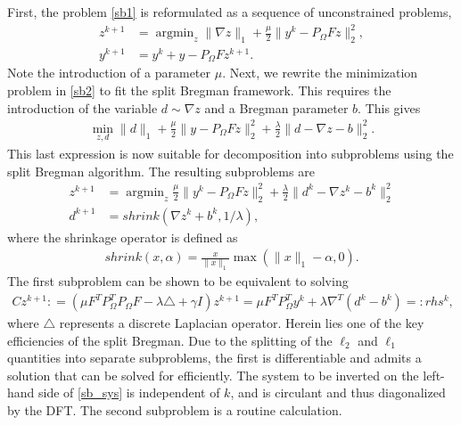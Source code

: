 \documentclass[11pt, oneside]{article}   %
\DeclareMathOperator*{\argmin}{argmin}
\newcommand{\norm}[1]{\lVert #1 \rVert}
\newcommand{\defined}{\mathrel{\mathop:}=}
\newcommand{\definedby}{=\mathrel{\mathop:}}
\begin{document}
\begin{appendices}
First, the problem \eqref{sb1} is reformulated as a sequence of unconstrained problems, 
\begin{align}
z^{k+1} &= \argmin_z \norm{\nabla z}_1 + \frac{\mu}{2} \norm{y^k - P_\Omega Fz}_2^2, \label{sb2}
\\
y^{k+1} &= y^k + y - P_\Omega F z^{k+1}. \label{sb3}
\end{align}
Note the introduction of a parameter $\mu$. Next, we rewrite the minimization problem in \eqref{sb2} to fit the split Bregman framework. This requires the introduction of the variable $d \sim \nabla z$ and a Bregman parameter $b$. This gives 
\begin{align*}
\min_{z, d} \norm{d}_1 + \frac{\mu}{2}\norm{y - P_\Omega Fz}_2^2 + \frac{\lambda}{2}\norm{d - \nabla z - b}^2_2.
\end{align*}
This last expression is now suitable for decomposition into subproblems using the split Bregman algorithm. The resulting subproblems are 
\begin{align*}
z^{k+1} &= \argmin_z \frac{\mu}{2}\norm{y^{ k} - P_\Omega F z}_2^2 + \frac{\lambda}{2} \norm{ d^k - \nabla z^k - b^k}^2_2 \\
d^{k+1} &= shrink(\nabla z^k + b^k, 1/\lambda), 
\end{align*}
where the shrinkage operator is defined as 
\begin{align*}
shrink(x, \alpha) = \frac{x}{\norm{x}_1}\max(\norm{x}_1 - \alpha, 0).
\end{align*}
The first subproblem can be shown to be equivalent to solving 
\begin{align}
Cz^{k+1} \defined (\mu F^TP_\Omega^T P_\Omega F - \lambda \triangle + \gamma I) z^{k+1} 
= \mu F^T P_\Omega^T y^{k}  + \lambda \nabla^T(d^k - b^k) \definedby rhs^k, 
\label{sb_sys}
\end{align}
where $\triangle$ represents a discrete Laplacian operator.
Herein lies one of the key efficiencies of the split Bregman. Due to the splitting of the $\ell_2$ and $\ell_1$ quantities into separate subproblems, the first is differentiable and admits a solution that can be solved for efficiently. The system to be inverted on the left-hand side of \eqref{sb_sys} is independent of $k$, and is circulant and thus diagonalized by the DFT. The second subproblem is a routine calculation. 


\end{appendices}
\end{document}
